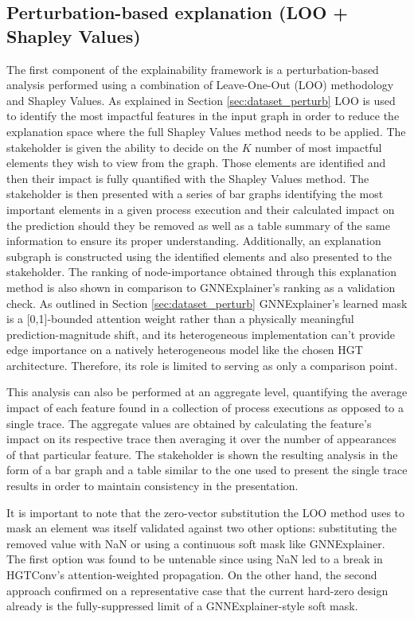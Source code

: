     \subsection{Perturbation-based explanation (LOO + Shapley Values)}
        The first component of the explainability framework is a perturbation-based analysis performed using a combination of Leave-One-Out (LOO) methodology and Shapley Values. As explained in Section \ref{sec:dataset_perturb} LOO is used to identify the most impactful features in the input graph in order to reduce the explanation space where the full Shapley Values method needs to be applied. The stakeholder is given the ability to decide on the $K$ number of most impactful elements they wish to view from the graph. Those elements are identified and then their impact is fully quantified with the Shapley Values method. 
        The stakeholder is then presented with a series of bar graphs identifying the most important elements in a given process execution and their calculated impact on the prediction should they be removed as well as a table summary of the same information to ensure its proper understanding. Additionally, an explanation subgraph is constructed using the identified elements and also presented to the stakeholder.
        The ranking of node-importance obtained through this explanation method is also shown in comparison to GNNExplainer's ranking as a validation check. As outlined in Section \ref{sec:dataset_perturb} GNNExplainer's learned mask is a [0,1]-bounded attention weight rather than a physically meaningful prediction-magnitude shift, and its heterogeneous implementation can't provide edge importance on a natively heterogeneous model like the chosen HGT architecture. Therefore, its role is limited to serving as only a comparison point.

        This analysis can also be performed at an aggregate level, quantifying the average impact of each feature found in a collection of process executions as opposed to a single trace. The aggregate values are obtained by calculating the feature's impact on its respective trace then averaging it over the number of appearances of that particular feature. The stakeholder is shown the resulting analysis in the form of a bar graph and a table similar to the one used to present the single trace results in order to maintain consistency in the presentation.

        It is important to note that the zero-vector substitution the LOO method uses to mask an element was itself validated against two other options: substituting the removed value with NaN or using a continuous soft mask like GNNExplainer. The first option was found to be untenable since using NaN led to a break in HGTConv's attention-weighted propagation. On the other hand, the second approach confirmed on a representative case that the current hard-zero design already is the fully-suppressed limit of a GNNExplainer-style soft mask.

